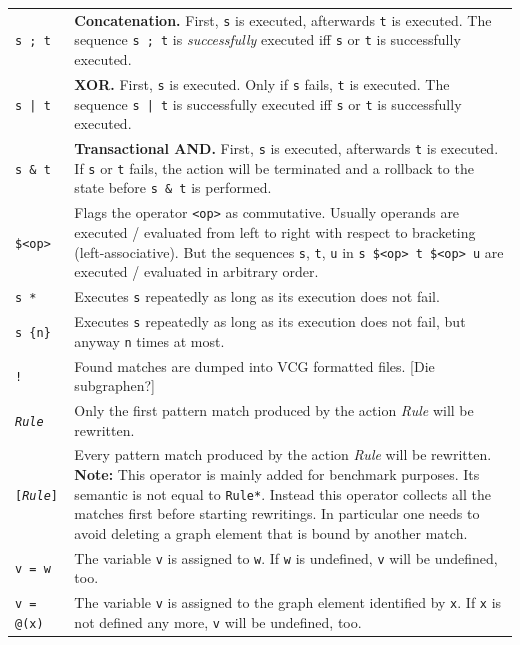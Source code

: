 \begin{table}[htbp]
\begin{tabularx}{\linewidth}{|lX|}
\hline
\texttt{s ; t}		& \textbf{Concatenation.} First, \texttt{s} is executed, afterwards \texttt{t} is executed. The sequence \texttt{s ; t} is \emph{successfully} executed iff \texttt{s} or \texttt{t} is successfully executed.\\
\texttt{s | t}		& \textbf{XOR.} First, \texttt{s} is executed. Only if \texttt{s} fails, \texttt{t} is executed. The sequence \texttt{s | t} is successfully executed iff \texttt{s} or \texttt{t} is successfully executed.\\
\texttt{s \& t}	& \textbf{Transactional AND.} First, \texttt{s} is executed, afterwards \texttt{t} is executed. If \texttt{s} or \texttt{t} fails, the action will be terminated and a rollback to the state before \texttt{s \& t} is performed.\\
\texttt{\$<op>}	& Flags the operator \texttt{<op>} as commutative. Usually operands are executed / evaluated from left to right with respect to bracketing (left-associative). But the sequences \texttt{s}, \texttt{t}, \texttt{u} in \texttt{s \$<op> t \$<op> u} are executed / evaluated in arbitrary order. \\
\texttt{s *}		& Executes \texttt{s} repeatedly as long as its execution does not fail.\\
\texttt{s \{n\}}	& Executes \texttt{s} repeatedly as long as its execution does not fail, but anyway \texttt{n} times at most.\\
\texttt{!}		& Found matches are dumped into VCG formatted files. [Die subgraphen?]\\
\texttt{\emph{Rule}} & Only the first pattern match produced by the action \emph{Rule} will be rewritten.\\
\texttt{[\emph{Rule}]} & Every pattern match produced by the action \emph{Rule} will be rewritten. \textbf{Note:} This operator is mainly added for benchmark purposes. Its semantic is not equal to \texttt{Rule*}. Instead this operator collects all the matches first before starting rewritings. In particular one needs to avoid deleting a graph element that is bound by another match. \\
\texttt{v = w}	& The variable \texttt{v} is assigned to \texttt{w}. If \texttt{w} is undefined, \texttt{v} will be undefined, too.\\
\texttt{v = @(x)}	& The variable \texttt{v} is assigned to the graph element identified by \texttt{x}. If \texttt{x} is not defined any more, \texttt{v} will be undefined, too.\\

\end{tabularx}
\end{table}
